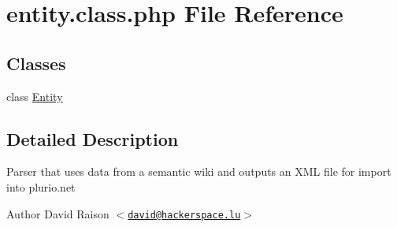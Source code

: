 \hypertarget{entity_8class_8php}{
\section{entity.class.php File Reference}
\label{entity_8class_8php}
}
\subsection*{Classes}
\begin{DoxyCompactItemize}
\item 
class \hyperlink{classEntity}{Entity}
\end{DoxyCompactItemize}


\subsection{Detailed Description}
Parser that uses data from a semantic wiki and outputs an XML file for import into plurio.net

\begin{DoxyAuthor}{Author}
David Raison $<$\href{mailto:david@hackerspace.lu}{\tt david@hackerspace.lu}$>$ 
\end{DoxyAuthor}
